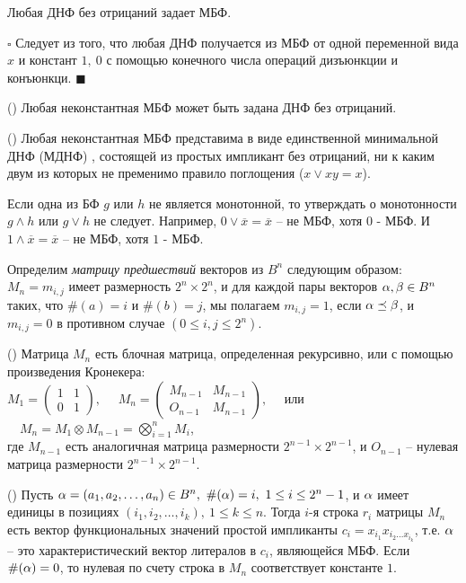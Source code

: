   \begin{Corollary}
    Любая ДНФ без отрицаний задает МБФ.
  \end{Corollary}
    $\square$
    Следует из того, что любая ДНФ получается из МБФ от одной переменной вида $x$ и констант $1,\ 0$
    с помощью конечного числа операций дизъюнкции и конъюнкци.
    $\blacksquare$
  \begin{Corollary}
    (\cite{Moschenski-2001}) Любая неконстантная МБФ может быть задана ДНФ без отрицаний.
  \end{Corollary}
  \begin{Corollary}
    (\cite{MDNF})
    Любая неконстантная МБФ представима в виде единственной
    минимальной ДНФ (МДНФ) , состоящей из простых импликант без отрицаний, 
    ни к каким двум из которых не пременимо правило поглощения 
    ($x \vee xy = x$).
  \end{Corollary}
  \begin{Remark}
    Если одна из БФ $g$ или $h$ не является монотонной, то утверждать о монотонности 
    $g \wedge h$ или $g \vee h$ не следует.
    Например, $0 \vee \overline{x} = \overline{x}$ -- не МБФ, хотя $0$ - МБФ.
    И $1 \wedge \overline{x} = \overline{x}$ -- не МБФ, хотя $1$ - МБФ.
   \end{Remark}

Определим \emph{матрицу предшествий} векторов из $B^n$ следующим образом: 
$M_n = m_{i,j}$ имеет размерность $2^n \times 2^n$, и для каждой пары векторов
$\alpha, \beta \in B^n$ таких, что $\#(a) = i$ и $\#(b) = j$, мы полагаем
$m_{i,j} = 1$, если $\alpha \preceq \beta$, и $m_{i,j} = 0$ в противном случае $(0 \leq i, j \leq 2^n)$.
\begin{Theorem} 
(\cite{bakoev2012})
 Матрица $M_n$ есть блочная матрица, определенная рекурсивно, или с помощью 
 произведения Кронекера:\\
 
 $M_1 = \begin{pmatrix}
        1 & 1\\
        0 & 1
       \end{pmatrix}, \quad$ 
 $M_n = \begin{pmatrix}
        M_{n-1} & M_{n-1}\\
        O_{n-1} & M_{n-1}
       \end{pmatrix},\quad$ 
       или
       $\quad M_n = M_1 \otimes M_{n-1} = \bigotimes\limits^n_{i=1} M_i$, \\
  где $M_{n-1}$ есть аналогичная матрица размерности $2^{n-1} \times 2^{n-1}$,
  и $O_{n-1}$ -- нулевая матрица размерности $2^{n-1} \times 2^{n-1}$.
\end{Theorem}
\begin{Theorem}\label{Th_fun_values_implicants}
(\cite{bakoev2012})
 Пусть $\al = (a_1, a_2, \dots, a_n) \in B^n,\ \#(\al) = i,\ 
 1 \leq i \leq 2^n -1 $,
 и $\alpha$ имеет единицы в позициях $(i_1, i_2, \dots,i_k),\ 1 \leq k \leq n$.
 Тогда $i$-я строка $r_i$ матрицы $M_n$ есть вектор функциональных значений
 простой импликанты $c_i = x_{i_1}x_{i_2\dots x_{i_k}}$, т.е. $\alpha$ -- это 
 характеристический вектор литералов в $c_i$, являющейся МБФ.
 Если $\#(\alpha)=0$, то нулевая по счету строка в $M_n$ соответствует константе $1$. 
\end{Theorem}

